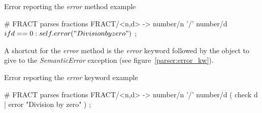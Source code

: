 \begin{code}
\caption{Error reporting the \emph{error} method example}	\label{parser:error_method}
\begin{verbatimtab}[4]
	# FRACT parses fractions
	FRACT/<n,d> ->
		number/n '/' number/d
		$ if d==0: self.error("Division by zero") $
		;
\end{verbatimtab}
\end{code}

A shortcut for the \emph{error} method is the \emph{error} keyword followed by the object to give to the \emph{SemanticError} exception (see figure~\ref{parser:error_kw}).

\begin{code}
\caption{Error reporting the \emph{error} keyword example}	\label{parser:error_kw}
\begin{verbatimtab}[4]
	# FRACT parses fractions
	FRACT/<n,d> ->
		number/n '/' number/d
		( check d | error "Division by zero" )
		;
\end{verbatimtab}
\end{code}

